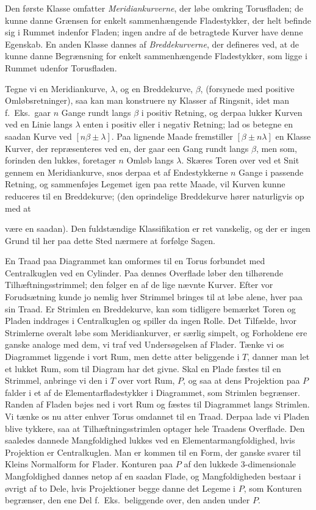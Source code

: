 \documentclass{article}
\begin{document}
Den første Klasse omfatter \emph{Meridiankurverne}, der løbe omkring Torusfladen; de kunne danne Grænsen for enkelt sammenhængende Fladestykker, der helt befinde sig i Rummet indenfor Fladen; ingen andre af de betragtede Kurver have denne Egenskab. En anden Klasse dannes af \emph{Breddekurverne}, der defineres ved, at de kunne danne Begrænsning for enkelt sammenhængende Fladestykker, som ligge i Rummet udenfor Torusfladen.

Tegne vi en Meridiankurve, $\lambda$, og en Breddekurve, $\beta$, (forsynede med positive Omløbsretninger), saa kan man konstruere ny Klasser af Ringsnit, idet man f.~Eks.\ gaar $n$ Gange rundt langs $\beta$ i positiv Retning, og derpaa lukker Kurven ved en Linie langs $\lambda$ enten i positiv eller i negativ Retning; lad os betegne en saadan Kurve ved $[n\beta \pm \lambda]$. Paa lignende Maade fremstiller $[\beta \pm n\lambda]$ en Klasse Kurver, der repræsenteres ved en, der gaar een Gang rundt langs $\beta$, men som, forinden den lukkes, foretager $n$ Omløb langs $\lambda$. Skæres Toren over ved et Snit gennem en Meridiankurve, snos derpaa et af Endestykkerne $n$ Gange i passende Retning, og sammenføjes Legemet igen paa rette Maade, vil Kurven kunne reduceres til en Breddekurve; (den oprindelige Breddekurve hører naturligvis op med at

være en saadan). Den fuldstændige Klassifikation er ret vanskelig, og der er ingen Grund til her paa dette Sted nærmere at forfølge Sagen.

En Traad paa Diagrammet kan omformes til en Torus forbundet med Centralkuglen ved en Cylinder. Paa dennes Overflade løber den tilhørende Tilhæftningsstrimmel; den følger en af de lige nævnte Kurver. Efter vor Forudsætning kunde jo nemlig hver Strimmel bringes til at løbe alene, hver paa sin Traad. Er Strimlen en Breddekurve, kan som tidligere bemærket Toren og Pladen inddrages i Centralkuglen og spiller da ingen Rolle. Det Tilfælde, hvor Strimlerne overalt løbe som Meridiankurver, er særlig simpelt, og Forholdene ere ganske analoge med dem, vi traf ved Undersøgelsen af Flader. Tænke vi os Diagrammet liggende i vort Rum, men dette atter beliggende i $T$, danner man let et lukket Rum, som til Diagram har det givne. Skal en Plade fæstes til en Strimmel, anbringe vi den i $T$ over vort Rum, $P$, og saa at dens Projektion paa $P$ falder i et af de Elementarfladestykker i Diagrammet, som Strimlen begrænser. Randen af Fladen bøjes ned i vort Rum og fæstes til Diagrammet langs Strimlen. Vi tænke os nu atter enhver Torus omdannet til en Traad. Derpaa lade vi Pladen blive tykkere, saa at Tilhæftningsstrimlen optager hele Traadens Overflade. Den saaledes dannede Mangfoldighed lukkes ved en Elementarmangfoldighed, hvis Projektion er Centralkuglen. Man er kommen til en Form, der ganske svarer til Kleins Normalform for Flader. Konturen paa $P$ af den lukkede 3-dimensionale Mangfoldighed dannes netop af en saadan Flade, og Mangfoldigheden bestaar i øvrigt af to Dele, hvis Projektioner begge danne det Legeme i $P$, som Konturen begrænser, den ene Del f.~Eks.\ beliggende over, den anden under $P$.
\end{document}
